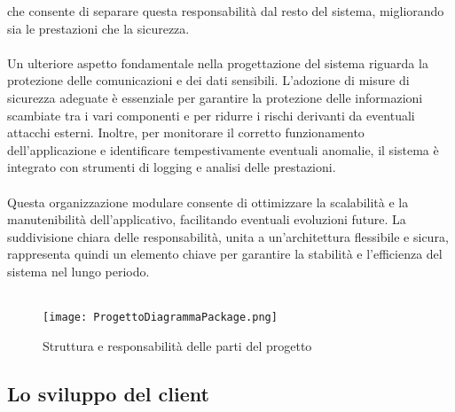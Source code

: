 che consente di separare questa responsabilità dal resto del sistema, migliorando sia le prestazioni che la sicurezza.\\
\\
Un ulteriore aspetto fondamentale nella progettazione del sistema riguarda la protezione delle comunicazioni e dei dati sensibili.
L’adozione di misure di sicurezza adeguate è essenziale per garantire la protezione delle informazioni scambiate tra i vari componenti e
per ridurre i rischi derivanti da eventuali attacchi esterni.
Inoltre, per monitorare il corretto funzionamento dell’applicazione e identificare tempestivamente eventuali anomalie,
il sistema è integrato con strumenti di logging e analisi delle prestazioni.\\
\\
Questa organizzazione modulare consente di ottimizzare la scalabilità e la manutenibilità dell’applicativo,
facilitando eventuali evoluzioni future.
La suddivisione chiara delle responsabilità, unita a un’architettura flessibile e sicura,
rappresenta quindi un elemento chiave per garantire la stabilità e l’efficienza del sistema nel lungo periodo.\\
\\

\begin{figure}[h!]
    \centering
    \texttt{[image: ProgettoDiagrammaPackage.png]}
    \caption{Struttura e responsabilità delle parti del progetto}
\end{figure}

\clearpage
\subsection{Lo sviluppo del client}

